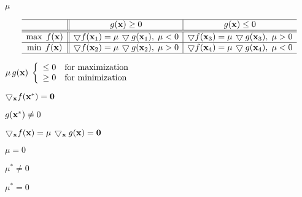 \documentclass{article}
\def\lthtmlcheckvsize{\ifdim\ht\sizebox<\vsize 
  \ifdim\wd\sizebox<\hsize\expandafter\hfill\fi \expandafter\vfill
  \else\expandafter\vss\fi}%
\begin{document}
{\newpage\clearpage
{}%
$ \mu$%
\lthtmlindisplaymathZ
\lthtmlcheckvsize\clearpage}

{\newpage\clearpage
{}%
\begin{displaymath}\begin{array}{c||c|c}\hline
& g({\bf x})\ge 0 & g({\bf x})\le 0 \\\hline\hline
\max\; f({\bf x}) &\bigtriangledown f({\bf x}_1)=\mu\,\bigtriangledown g({\bf x}_1),\;\mu<0 &
\bigtriangledown f({\bf x}_3)=\mu\,\bigtriangledown g({\bf x}_3),\;\mu>0 \\\hline
\min\; f({\bf x}) & \bigtriangledown f({\bf x}_2)=\mu\,\bigtriangledown g({\bf x}_2),\;\mu>0 &
\bigtriangledown f({\bf x}_4)=\mu \,\bigtriangledown g({\bf x}_4),\;\mu<0 \\\hline
\end{array}\end{displaymath}%
\lthtmldisplayZ
\lthtmlcheckvsize\clearpage}

{\newpage\clearpage
{}%
$\displaystyle \mu\, g({\bf x})\;\left\{\begin{array}{ll}
\le 0 & \mbox{for maximization}\\\ge 0 & \mbox{for minimization}
\end{array}\right.$%
\lthtmlindisplaymathZ
\lthtmlcheckvsize\clearpage}

{\newpage\clearpage
{}%
$ \bigtriangledown_{\bf x} f({\bf x}^*)={\bf0}$%
\lthtmlindisplaymathZ
\lthtmlcheckvsize\clearpage}

{\newpage\clearpage
{}%
$ g({\bf x}^*)\ne 0$%
\lthtmlindisplaymathZ
\lthtmlcheckvsize\clearpage}

{\newpage\clearpage
{}%
$ \bigtriangledown_{\bf x} f({\bf x})
  =\mu\,\bigtriangledown_{\bf x} g({\bf x})={\bf0}$%
\lthtmlindisplaymathZ
\lthtmlcheckvsize\clearpage}

{\newpage\clearpage
{}%
$ \mu=0$%
\lthtmlindisplaymathZ
\lthtmlcheckvsize\clearpage}

{\newpage\clearpage
{}%
$ \mu^*\ne 0$%
\lthtmlindisplaymathZ
\lthtmlcheckvsize\clearpage}

{\newpage\clearpage
{}%
$ \mu^*=0$%
\lthtmlindisplaymathZ
\lthtmlcheckvsize\clearpage}
\end{document}
